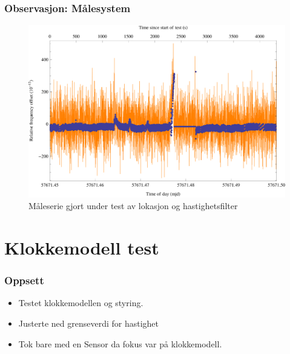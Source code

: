 \documentclass[xcolor=table]{beamer}
\begin{document}
\begin{frame}
\frametitle{Observasjon: Målesystem}
      \begin{figure}
        \includegraphics[scale=0.70]{thesis/graphics/cns91-and-csac-telemetry-frequency-1.png}
        \caption{Måleserie gjort under test av lokasjon og hastighetsfilter}
      \end{figure}
\end{frame}

\section{Klokkemodell test}
\begin{frame}
\frametitle{Oppsett}
  \begin{itemize}
    \item Testet klokkemodellen og styring.
    \item Justerte ned grenseverdi for hastighet
    \item Tok bare med en Sensor da fokus var på klokkemodell.
  \end{itemize}
\end{frame}
\end{document}
